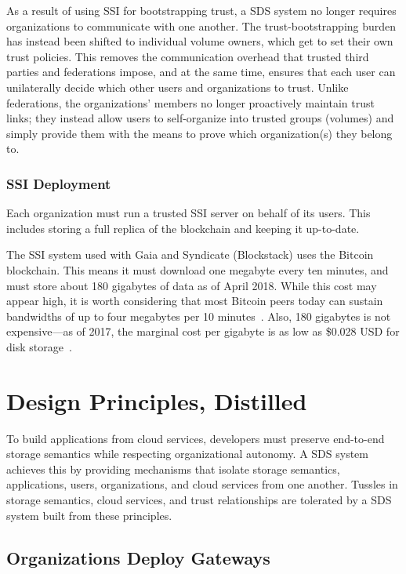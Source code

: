 As a result of using SSI for bootstrapping trust, a SDS system no longer requires
organizations to communicate with one another.
The trust-bootstrapping burden has instead been shifted to individual volume
owners, which get to set their own trust policies.  This removes the
communication overhead that trusted third parties and federations
impose, and at the same time, ensures that each user can unilaterally decide
which other users and organizations to trust.  Unlike federations, the 
organizations' members no longer proactively maintain trust links; they instead allow
users to self-organize into trusted groups (volumes) and simply provide them
with the means to prove which organization(s) they belong to.

\subsubsection{SSI Deployment}

Each organization must run a trusted SSI server on behalf of its users.  This
includes storing a full replica of the blockchain and keeping it up-to-date.

The SSI system used with Gaia and Syndicate (Blockstack) uses the Bitcoin
blockchain.  This means it must download one megabyte every ten minutes, and
must store about 180 gigabytes of data as of April 2018.  While this cost may
appear high, it is worth considering that most Bitcoin peers today can
sustain bandwidths of up to four megabytes per 10
minutes~\cite{on-blockchain-decentralization}.  Also, 180 gigabytes is not
expensive---as of 2017, the marginal cost per gigabyte is as low as
\$0.028 USD for disk storage~\cite{backblaze-hard-drive-cost-per-gigabyte}.

\section{Design Principles, Distilled}

To build applications from cloud services, developers must preserve
end-to-end storage semantics while respecting organizational autonomy.
A SDS system achieves this by providing mechanisms that isolate storage semantics, applications,
users, organizations, and cloud services from one another.  Tussles in storage
semantics, cloud services, and trust relationships are tolerated by a SDS system
built from these principles.

\subsection{Organizations Deploy Gateways}

